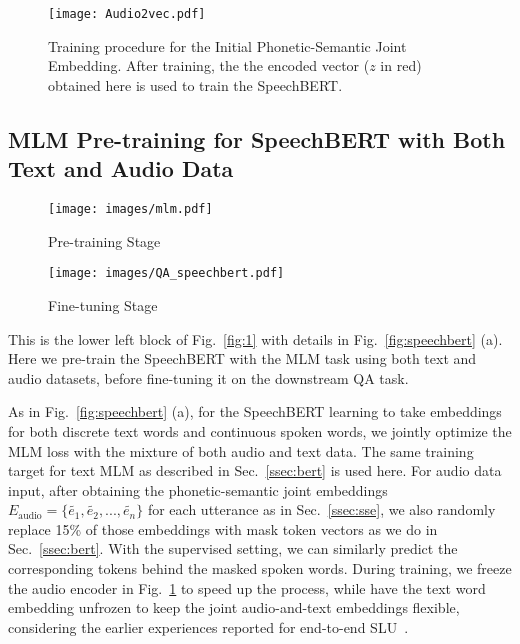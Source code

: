 \documentclass[a4paper]{article}
\begin{document}
\begin{figure}[t!]
    \centering
    \texttt{[image: Audio2vec.pdf]}
    \caption{Training procedure for the Initial Phonetic-Semantic Joint Embedding. After training, the the encoded vector ($z$ in red) obtained here is used to train the SpeechBERT.}
    \label{fig:audio2vec}
    \vspace{-15pt}
\end{figure}

\vspace{-5pt}
\subsection{MLM Pre-training for SpeechBERT with Both Text and Audio Data}
\label{ssec:trainproc}

\begin{figure*}[t!]
    \centering
    \begin{subfigure}{\columnwidth}
        \centering
        \texttt{[image: images/mlm.pdf]}   
        \caption{Pre-training Stage}
    \end{subfigure}
    \begin{subfigure}{\columnwidth}
        \centering
        \texttt{[image: images/QA\_speechbert.pdf]}
        \caption{Fine-tuning Stage}
    \end{subfigure}
    \caption{Two training stages for the SpeechBERT model: (a) Pre-training and (b) Fine-tuning. The two stages use identical model architecture except for the output layers. The special tokens [CLS] and [SEP] are added following the original Text BERT.}
    \label{fig:speechbert}
    \vspace{-15pt}
\end{figure*}

\vspace{-5pt}
This is the lower left block of Fig.~\ref{fig:1} with details in Fig.~\ref{fig:speechbert} (a). Here we pre-train the SpeechBERT with the MLM task using both text and audio datasets, before fine-tuning it on the downstream QA task.

As in Fig.~\ref{fig:speechbert} (a), for the SpeechBERT learning to take embeddings for both discrete text words and continuous spoken words, we jointly optimize the MLM loss with the mixture of both audio and text data. The same training target for text MLM as described in Sec.~\ref{ssec:bert} is used here. For audio data input, after obtaining the phonetic-semantic joint embeddings $E_{\text{audio}} = \{\tilde{e_1}, \tilde{e_2}, ..., \tilde{e_n}\}$ for each utterance as in Sec.~\ref{ssec:sse}, we also randomly replace 15\% of those embeddings with mask token vectors as we do in Sec.~\ref{ssec:bert}. With the supervised setting, we can similarly predict the corresponding tokens behind the masked spoken words. During training, we freeze the audio encoder in Fig.~\ref{fig:audio2vec} to speed up the process, while have the text word embedding unfrozen to keep the joint audio-and-text embeddings flexible, considering the earlier experiences reported for end-to-end SLU~\cite{Lugosch2019}.
\end{document}
